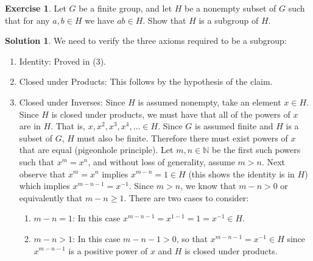 \documentclass[12pt]{article}
\theoremstyle{definition}
\newtheorem{exercise}{Exercise}
\theoremstyle{definition}
\newtheorem{solution}{Solution}
\begin{document}
\begin{exercise}
Let $G$ be a finite group, and let $H$ be a nonempty subset of $G$ such that for any $a,b \in H$ we have $ab \in H$. Show that $H$ is a subgroup of $H$. 
\end{exercise}		
\begin{solution}
We need to verify the three axioms required to be a subgroup:
\begin{enumerate}
	\item Identity: Proved in (3).
	\item Closed under Products: This follows by the hypothesis of the claim.
	\item Closed under Inverses: Since $H$ is assumed nonempty, take an element $x \in H$. Since $H$ is closed under products, we must have that all of the powers of $x$ are in $H$. That is, $x, x^2, x^3, x^4, \ldots \in H$. Since $G$ is assumed finite and $H$ is a subset of $G$, $H$ must also be finite. Therefore there must exist powers of $x$ that are equal (pigeonhole principle). Let $m,n \in \mathbb{N}$ be the first such powers such that $x^m = x^n$, and without loss of generality, assume $m > n$. Next observe that $x^m = x^n$ implies $x^{m-n} = 1 \in H$ (this shows the identity is in $H$) which implies $x^{m-n-1} = x^{-1}$. Since  $m > n$, we know that $m -n >0$ or equivalently that $m -n \geq 1$. There are two cases to consider:
	\begin{enumerate}
		\item $m-n = 1$: In this case $x^{m-n-1} = x^{1-1} = 1 = x^{-1} \in H$. 
		\item $m - n > 1$: In this case $m - n - 1 > 0$, so that $x^{m-n-1} = x^{-1} \in H$ since $x^{m-n-1}$ is a positive power of $x$ and $H$ is closed under products. 
	\end{enumerate}
\end{enumerate}
\end{solution}
\end{document}
